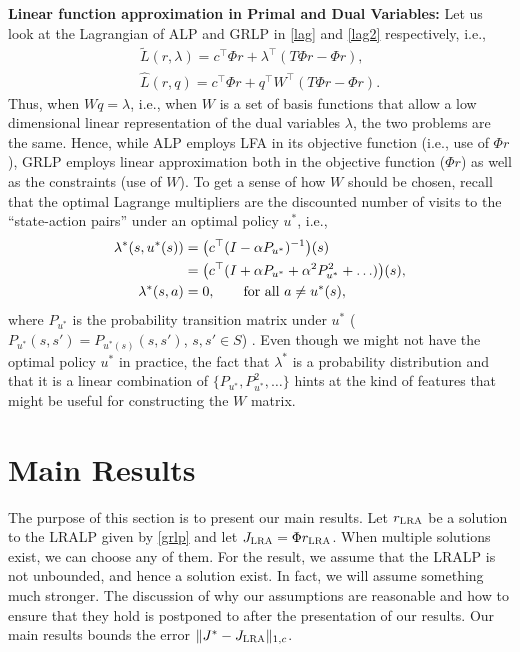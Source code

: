 \documentclass[12pt,draftcls,onecolumn]{IEEEtran}
\begin{document}
\textbf{Linear function approximation in Primal and Dual Variables:} Let us look at the Lagrangian of ALP and GRLP in
\eqref{lag} and \eqref{lag2} respectively, i.e.,
\begin{align}\label{lag}
\tilde{L}(r,\lambda)=c^\top \Phi r+\lambda^\top (T\Phi r-\Phi r), \\ \label{lag2}\hat{L}(r,q)=c^\top \Phi r+q^\top W^\top (T\Phi r-\Phi r).
\end{align}
Thus, when $Wq = \lambda$, i.e., when $W$ is a set of basis functions that allow
a low dimensional linear representation of the dual variables $\lambda$,
the two problems are the same.
Hence, while ALP employs LFA in its objective function (i.e., use of $\Phi r$), GRLP employs linear approximation both in the objective function ($\Phi r$) as well as the constraints (use of $W$).
To get a sense of how $W$ should be chosen, recall that
the optimal Lagrange multipliers are the discounted number of visits to the ``state-action pairs'' under an optimal policy $u^*$, i.e.,
\begin{align}
\lambda^*(s,u^*(s))&=\big(c^\top(I-\alpha P_{u^*})^{-1}\big)(s)\nonumber\\
&= \big(c^\top(I+\alpha P_{u^*}+\alpha^2 P_{u^*}^2+\ldots)\big)(s),\nonumber\\
\lambda^*(s,a)&=0, \qquad \text{for all } a \neq u^*(s),\nonumber
\end{align}
where $P_{u^*}$ is the probability transition matrix under $u^*$ ($P_{u^*}(s,s') = P_{u^*(s)}(s,s')$, $s,s'\in S$) \cite{dolgov}. Even though we might not have the optimal policy $u^*$ in practice, the fact that $\lambda^*$ is a probability distribution and that it is a linear combination of $\{P_{u^*},P^2_{u^*},\ldots\}$ hints at the kind of features that might be useful for constructing the $W$ matrix.
\fi
\section{Main Results}


The purpose of this section is to present our main results.
Let $r_{\text{\sc LRA}}$ be a solution to the LRALP given by \eqref{grlp}
and let $J_{\text{\sc LRA}} = \Phi r_{\text{\sc LRA}}$. When multiple solutions exist, we can choose any of them.
For the result, we assume that the LRALP is not unbounded, and hence a solution exist. In fact, we will assume something much stronger. The discussion of why our assumptions are reasonable and how to ensure that they hold is postponed to after the presentation of our results.
Our main results bounds the error $\|J^* - J_{\text{\sc LRA}}\|_{1,c}$.
\end{document}
